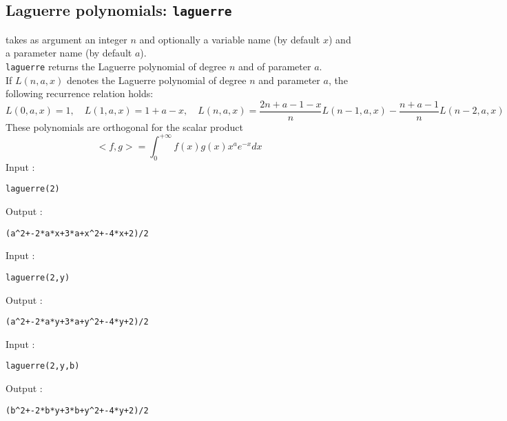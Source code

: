 \documentclass[a4paper,11pt]{book}
\begin{document}
\subsection{Laguerre polynomials: {\tt laguerre}}
 takes as argument an integer $n$ and optionally 
 a variable name (by default $x$) and a parameter name  (by default $a$).\\
{\tt laguerre} returns the  Laguerre polynomial of degree $n$ and of 
parameter $a$.\\
If $L(n,a,x)$ denotes the Laguerre polynomial of degree $n$ and 
parameter $a$, the following recurrence relation holds:
\[ L(0,a,x)=1, \quad
L(1,a,x)=1+a-x, \quad
L(n,a,x)=\frac{2n+a-1-x}{n}L(n-1,a,x)-\frac{n+a-1}{n}L(n-2,a,x) \]
These polynomials are orthogonal for the scalar product
\[ <f,g>=\int_{0}^{+\infty}f(x)g(x)x^ae^{-x}dx \]
Input :
\begin{center}{\tt laguerre(2)}\end{center}
Output :
\begin{center}{\tt (a\verb|^|2+-2*a*x+3*a+x\verb|^|2+-4*x+2)/2}\end{center}
Input :
\begin{center}{\tt laguerre(2,y)}\end{center}
Output :
\begin{center}{\tt (a\verb|^|2+-2*a*y+3*a+y\verb|^|2+-4*y+2)/2}\end{center}
Input :
\begin{center}{\tt laguerre(2,y,b)}\end{center}
Output :
\begin{center}{\tt (b\verb|^|2+-2*b*y+3*b+y\verb|^|2+-4*y+2)/2}\end{center}
\end{document}
